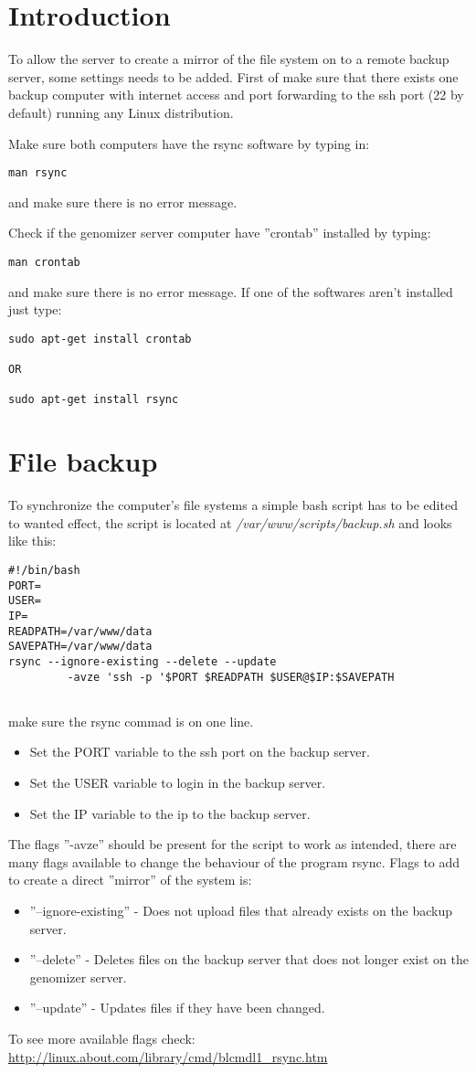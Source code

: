 \section{Introduction}
To allow the server to create a mirror of the file system on to a remote backup server, some settings needs to be added. First of make sure that there exists one backup computer 
with internet access and port forwarding to the ssh port (22 by default) running any Linux distribution.

Make sure both computers have the rsync software by typing in:
\begin{verbatim}
man rsync
\end{verbatim}
and make sure there is no error message.

Check if the genomizer server computer have ''crontab'' installed by typing:
\begin{verbatim}
man crontab
\end{verbatim}
and make sure there is no error message. If one of the softwares aren't installed just type:
\begin{verbatim}
sudo apt-get install crontab

OR

sudo apt-get install rsync
\end{verbatim}


\section{File backup}
To synchronize the computer's file systems a simple bash script has to be edited to wanted effect, the script is located at \emph{/var/www/scripts/backup.sh} and looks like this:
\begin{verbatim}
#!/bin/bash
PORT=
USER=
IP=
READPATH=/var/www/data
SAVEPATH=/var/www/data
rsync --ignore-existing --delete --update
         -avze 'ssh -p '$PORT $READPATH $USER@$IP:$SAVEPATH
         
\end{verbatim}
make sure the rsync commad is on one line.
\begin{itemize}
\item Set the PORT variable to the ssh port on the backup server.
\item Set the USER variable to login in the backup server.
\item Set the IP variable to the ip to the backup server.
\end{itemize}
The flags ''-avze'' should be present for the script to work as intended, there are many flags available to change the 
behaviour of the program rsync. Flags to add to create a direct ''mirror'' of the system is:
\begin{itemize}
\item ''--ignore-existing'' - Does not upload files that already exists on the backup server.
\item ''--delete'' - Deletes files on the backup server that does not longer exist on the genomizer server.
\item ''--update'' - Updates files if they have been changed.
\end{itemize}
To see more available flags check:
\url{http://linux.about.com/library/cmd/blcmdl1\_rsync.htm}

